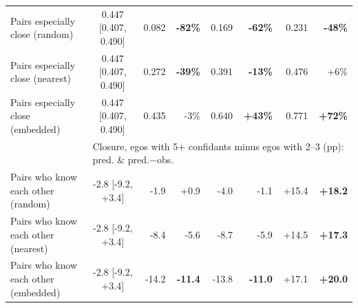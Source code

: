\begin{tabular}{lcrrrrrr}
Pairs especially close (random) & 0.447 [0.407, 0.490] & 0.082 & \textbf{-82\%} & 0.169 & \textbf{-62\%} & 0.231 & \textbf{-48\%} \\
Pairs especially close (nearest) & 0.447 [0.407, 0.490] & 0.272 & \textbf{-39\%} & 0.391 & \textbf{-13\%} & 0.476 & +6\% \\
Pairs especially close (embedded) & 0.447 [0.407, 0.490] & 0.435 & -3\% & 0.640 & \textbf{+43\%} & 0.771 & \textbf{+72\%} \\
\hline
 & \multicolumn{7}{l}{Closure, egos with 5+ confidants minus egos with 2--3 (pp): pred. \& pred.$-$obs.} \\
\hline
Pairs who know each other (random) & -2.8 [-9.2, +3.4] & -1.9 & +0.9 & -4.0 & -1.1 & +15.4 & \textbf{+18.2} \\
Pairs who know each other (nearest) & -2.8 [-9.2, +3.4] & -8.4 & -5.6 & -8.7 & -5.9 & +14.5 & \textbf{+17.3} \\
Pairs who know each other (embedded) & -2.8 [-9.2, +3.4] & -14.2 & \textbf{-11.4} & -13.8 & \textbf{-11.0} & +17.1 & \textbf{+20.0} \\
\hline
\end{tabular}
